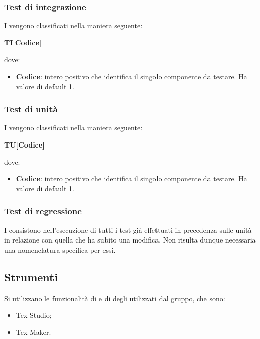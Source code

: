 		\subsubsection{Test di integrazione}
		I  vengono classificati nella maniera seguente:
		\begin{center}
			\textbf{TI[Codice]}
		\end{center}	
		dove:\\
		\begin{itemize}
			\item \textbf{Codice}: intero positivo che identifica il singolo componente da testare. Ha valore di default 1.
		\end{itemize}		 
		
		\subsubsection{Test di unità}
		I  vengono classificati nella maniera seguente:
		\begin{center}
			\textbf{TU[Codice]}
		\end{center}		
		dove:\\
		\begin{itemize}
			\item \textbf{Codice}: intero positivo che identifica il singolo componente da testare. Ha valore di default 1.
		\end{itemize}
		
		\subsubsection{Test di regressione}
		I  consistono nell'esecuzione di tutti i test già effettuati in precedenza sulle unità in relazione con quella che ha subito una modifica. Non risulta dunque necessaria una nomenclatura specifica per essi.
		
		\subsection{Strumenti}
		Si utilizzano le funzionalità di  e di  degli  utilizzati dal gruppo, che sono:
		\begin{itemize}
			\item Tex Studio;
			\item Tex Maker.
		\end{itemize}
